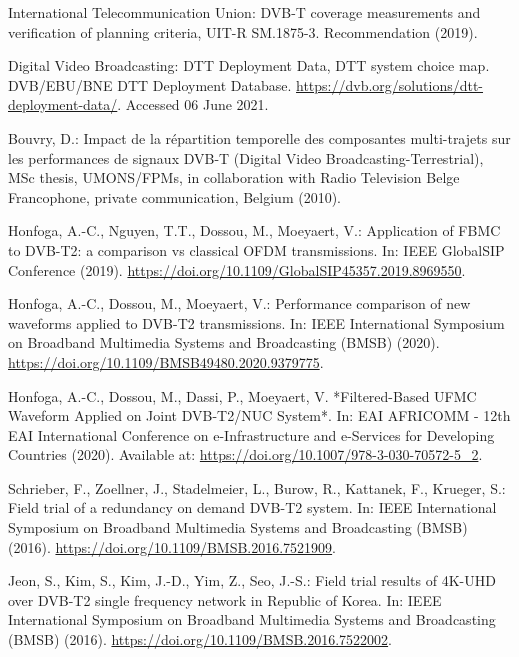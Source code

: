 \documentclass[10pt]{article}
\begin{document}
\begin{thebibliography}{99}
International Telecommunication Union: DVB-T coverage measurements and verification of planning criteria, UIT-R SM.1875-3. Recommendation (2019).

Digital Video Broadcasting: DTT Deployment Data, DTT system choice map. DVB/EBU/BNE DTT Deployment Database. \href{https://dvb.org/solutions/dtt-deployment-data/}{https://dvb.org/solutions/dtt-deployment-data/}. Accessed 06 June 2021.

Bouvry, D.: Impact de la répartition temporelle des composantes multi-trajets sur les performances de signaux DVB-T (Digital Video Broadcasting-Terrestrial), MSc thesis, UMONS/FPMs, in collaboration with Radio Television Belge Francophone, private communication, Belgium (2010).

Honfoga, A.-C., Nguyen, T.T., Dossou, M., Moeyaert, V.: Application of FBMC to DVB-T2: a comparison vs classical OFDM transmissions. In: IEEE GlobalSIP Conference (2019). \href{https://doi.org/10.1109/GlobalSIP45357.2019.8969550}{https://doi.org/10.1109/GlobalSIP45357.2019.8969550}.

Honfoga, A.-C., Dossou, M., Moeyaert, V.: Performance comparison of new waveforms applied to DVB-T2 transmissions. In: IEEE International Symposium on Broadband Multimedia Systems and Broadcasting (BMSB) (2020). \href{https://doi.org/10.1109/BMSB49480.2020.9379775}{https://doi.org/10.1109/BMSB49480.2020.9379775}.

Honfoga, A.-C., Dossou, M., Dassi, P., Moeyaert, V. *Filtered-Based UFMC Waveform Applied on Joint DVB-T2/NUC System*. In: EAI AFRICOMM - 12th EAI International Conference on e-Infrastructure and e-Services for Developing Countries (2020). Available at:  
\url{https://doi.org/10.1007/978-3-030-70572-5_2}.


Schrieber, F., Zoellner, J., Stadelmeier, L., Burow, R., Kattanek, F., Krueger, S.: Field trial of a redundancy on demand DVB-T2 system. In: IEEE International Symposium on Broadband Multimedia Systems and Broadcasting (BMSB) (2016). \href{https://doi.org/10.1109/BMSB.2016.7521909}{https://doi.org/10.1109/BMSB.2016.7521909}.

Jeon, S., Kim, S., Kim, J.-D., Yim, Z., Seo, J.-S.: Field trial results of 4K-UHD over DVB-T2 single frequency network in Republic of Korea. In: IEEE International Symposium on Broadband Multimedia Systems and Broadcasting (BMSB) (2016). \href{https://doi.org/10.1109/BMSB.2016.7522002}{https://doi.org/10.1109/BMSB.2016.7522002}.


\end{thebibliography}
\end{document}
